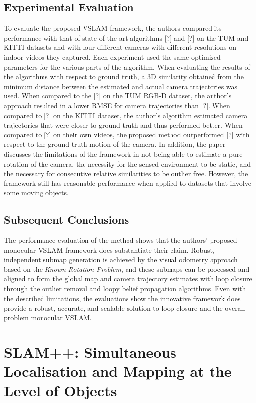\documentclass[10pt,twocolumn,letterpaper]{article}
\begin{document}
\subsection{Experimental Evaluation}
To evaluate the proposed VSLAM framework, the authors compared its performance 
with that of state of the art algorithms [?] and [?] on the TUM and KITTI datasets and 
with four different cameras with different resolutions on indoor videos they captured.  
Each experiment used the same optimized parameters for the various parts of the algorithm.  
When evaluating the results of the algorithms with respect to ground truth, a 3D similarity 
obtained from the minimum distance between the estimated and actual camera trajectories 
was used.  When compared to the [?] on the TUM RGB-D dataset, the author's approach resulted in a 
lower RMSE for camera trajectories than [?].  When compared to [?] on the KITTI dataset, 
the author's algorithm estimated camera trajectories that were closer to ground truth and 
thus performed better. When compared to [?] on their own videos, the proposed 
method outperformed [?] with respect to the ground truth motion of the camera.  
In addition, the paper discusses the limitations of the framework in not being able to 
estimate a pure rotation of the camera, the necessity for the sensed environment 
to be static, and the necessary for consecutive relative similarities to be outlier free. 
However, the framework still has reasonable performance when applied to datasets 
that involve some moving objects.

\subsection{Subsequent Conclusions}
The performance evaluation of the method shows that the authors' proposed monocular VSLAM framework does
 substantiate their claim.  Robust, independent submap generation is achieved by the visual odometry approach 
based on the \textit{Known Rotation Problem}, and these submaps can be processed and aligned to form the 
global map and camera trajectory estimates with loop closure through the outlier removal and loopy belief 
propagation algorithms.  Even with the described limitations, the evaluations show the innovative framework does 
provide a robust, accurate, and scalable solution to loop closure and the overall problem monocular VSLAM.

\section {SLAM++: Simultaneous Localisation and Mapping at the Level of Objects}
\end{document}
